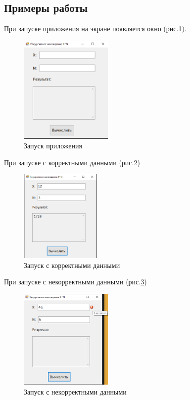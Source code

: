 \subsection{Примеры работы}

При запуске приложения на экране появляется окно (рис.\ref{fig:StartForm3}).

\begin{figure}[!h]
    \centering
    \includegraphics[width = 0.4\textwidth]{images/Task3/Start.png}
    \caption{Запуск приложения}
    \label{fig:StartForm3}
\end{figure}

При запуске с корректными данными (рис.\ref{fig:WorkForm3})

\begin{figure}[!h]
    \centering
    \includegraphics[width = 0.35\textwidth]{images/Task3/Work1.png}
    \caption{Запуск с корректными данными}
    \label{fig:WorkForm3}
\end{figure}

При запуске с некорректными данными (рис.\ref{fig:BadInputNotIntForm3})

\begin{figure}[!h]
    \centering
    \includegraphics[width = 0.4\textwidth]{images/Task3/BadInputNotInt1.png}
    \caption{Запуск с некорректными данными}
    \label{fig:BadInputNotIntForm3}
\end{figure}

